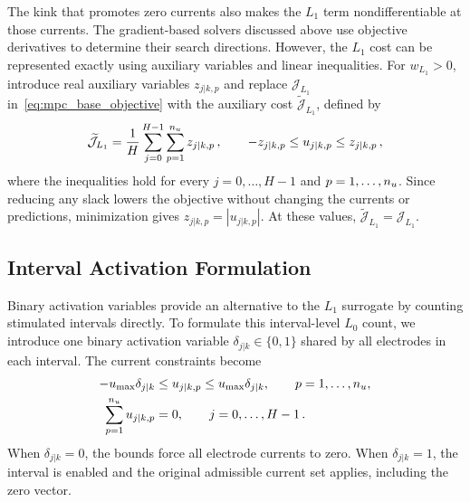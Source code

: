 The kink that promotes zero currents also makes the $L_1$ term nondifferentiable at those currents.
The gradient-based solvers discussed above use objective derivatives to determine their search directions.
However, the $L_1$ cost can be represented exactly using auxiliary variables and linear inequalities.
For $w_{L_1}>0$, introduce real auxiliary variables $z_{j|k,p}$ and replace $\mathcal J_{L_1}$ in~\eqref{eq:mpc_base_objective} with the auxiliary cost $\widetilde{\mathcal J}_{L_1}$, defined by
%
\begin{equation}
    \widetilde{\mathcal J}_{L_1}
    = \frac{1}{H}\sum_{j=0}^{H-1}\sum_{p=1}^{n_{u}}z_{j|k,p}\,,
    \qquad
    -z_{j|k,p}\leq u_{j|k,p}\leq z_{j|k,p}\,,
    \label{eq:mpc_l1_epigraph}
\end{equation}
%
where the inequalities hold for every $j=0,\ldots,H-1$ and $p=1,\ldots,n_{u}$.
Since reducing any slack lowers the objective without changing the currents or predictions, minimization gives $z_{j|k,p}=|u_{j|k,p}|$.
At these values, $\widetilde{\mathcal J}_{L_1}=\mathcal J_{L_1}$.

\subsection{Interval Activation Formulation}

Binary activation variables provide an alternative to the $L_1$ surrogate by counting stimulated intervals directly.
To formulate this interval-level $L_0$ count, we introduce one binary activation variable $\delta_{j|k}\in\{0, 1\}$ shared by all electrodes in each interval.
The current constraints become
%
\begin{equation}
    \begin{aligned}
        -u_\mathrm{max}\delta_{j|k} %
        &\leq u_{j|k,p}\leq u_\mathrm{max}\delta_{j|k}, %
        \qquad p=1,\ldots,\ndim{u},\\
        \sum_{p=1}^{\ndim{u}}u_{j|k,p}&=0,
        \qquad j=0,\ldots,H-1\,.
    \end{aligned}
    \label{eq:mpc_activation_gates}
\end{equation}
%
When $\delta_{j|k}=0$, the bounds force all electrode currents to zero.
When $\delta_{j|k}=1$, the interval is enabled and the original admissible current set applies, including the zero vector.

